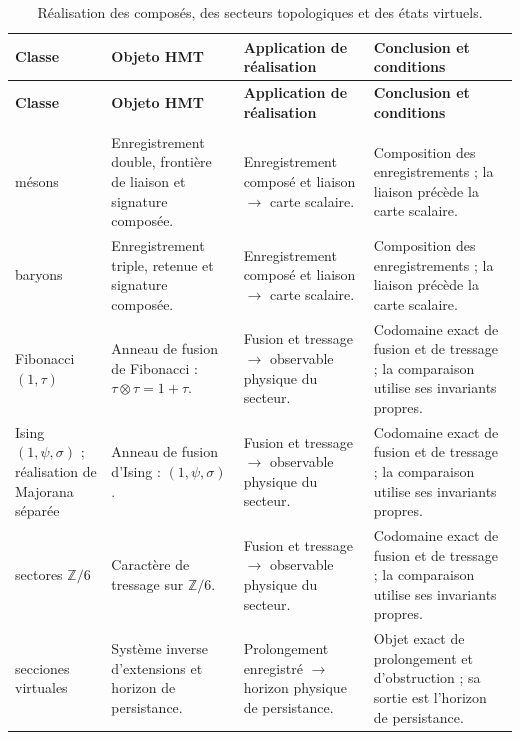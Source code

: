 \begingroup
\setlength{\tabcolsep}{4.5pt}
\renewcommand{\arraystretch}{1.28}
\begin{longtable}{@{}>{\raggedright\arraybackslash}p{}>{\raggedright\arraybackslash}p{}>{\raggedright\arraybackslash}p{}>{\raggedright\arraybackslash}p{}@{}}
\caption{Réalisation des composés, des secteurs topologiques et des états virtuels.}\label{tab:masas-realizacion-no-escalar}\\
\toprule
\textbf{Classe} & \textbf{Objeto HMT} & \textbf{Application de réalisation} & \textbf{Conclusion et conditions} \\
\midrule
\endfirsthead
\toprule
\textbf{Classe} & \textbf{Objeto HMT} & \textbf{Application de réalisation} & \textbf{Conclusion et conditions} \\
\midrule
\endhead
\midrule
\multicolumn{4}{r}{\footnotesize Suite à la page suivante.}\\
\endfoot
\bottomrule
\endlastfoot
mésons & Enregistrement double, frontière de liaison et signature composée. & Enregistrement composé et liaison $\to$ carte scalaire. & Composition des enregistrements ; la liaison précède la carte scalaire. \\
baryons & Enregistrement triple, retenue et signature composée. & Enregistrement composé et liaison $\to$ carte scalaire. & Composition des enregistrements ; la liaison précède la carte scalaire. \\
Fibonacci $(1,\tau)$ & Anneau de fusion de Fibonacci : $\tau\otimes\tau=1+\tau$. & Fusion et tressage $\to$ observable physique du secteur. & Codomaine exact de fusion et de tressage ; la comparaison utilise ses invariants propres. \\
Ising $(1,\psi,\sigma)$ ; réalisation de Majorana séparée & Anneau de fusion d’Ising : $(1,\psi,\sigma)$. & Fusion et tressage $\to$ observable physique du secteur. & Codomaine exact de fusion et de tressage ; la comparaison utilise ses invariants propres. \\
sectores $\mathbb Z/6$ & Caractère de tressage sur $\mathbb Z/6$. & Fusion et tressage $\to$ observable physique du secteur. & Codomaine exact de fusion et de tressage ; la comparaison utilise ses invariants propres. \\
secciones virtuales & Système inverse d’extensions et horizon de persistance. & Prolongement enregistré $\to$ horizon physique de persistance. & Objet exact de prolongement et d’obstruction ; sa sortie est l’horizon de persistance. \\
\end{longtable}
\endgroup
